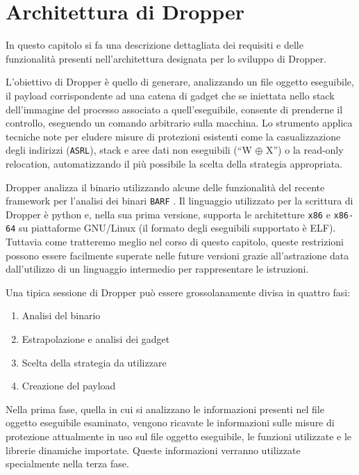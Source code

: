 \chapter{Architettura di Dropper}
\label{cap:architettura}

In questo capitolo si fa una descrizione dettagliata dei requisiti e
delle funzionalità presenti nell'architettura designata per lo
sviluppo di Dropper.

L'obiettivo di Dropper è quello di generare, analizzando un file
oggetto eseguibile, il payload corrispondente ad una catena di gadget
che se iniettata nello stack dell'immagine del processo associato a
quell'eseguibile, consente di prenderne il controllo, eseguendo un
comando arbitrario sulla macchina. Lo strumento applica tecniche note
per eludere misure di protezioni esistenti come la casualizzazione
degli indirizzi (\lstinline{ASRL}), stack e aree dati non eseguibili
(``W $\oplus$ X'') o la read-only relocation, automatizzando il più
possibile la scelta della strategia appropriata. 

Dropper analizza il binario utilizzando alcune delle funzionalità del
recente framework per l'analisi dei binari \lstinline{BARF}
\cite{Heitman-14}. Il linguaggio utilizzato per la scrittura di
Dropper è python e, nella sua prima versione, supporta le architetture
\lstinline{x86} e \lstinline{x86-64} su piattaforme GNU/Linux (il
formato degli eseguibili supportato è ELF). Tuttavia come tratteremo
meglio nel corso di questo capitolo, queste restrizioni possono essere
facilmente superate nelle future versioni grazie all'astrazione data
dall'utilizzo di un linguaggio intermedio per rappresentare le
istruzioni.

Una tipica sessione di Dropper può essere grossolanamente divisa in
quattro fasi:

\begin{enumerate}
\item Analisi del binario 
\item Estrapolazione e analisi dei gadget
\item Scelta della strategia da utilizzare
\item Creazione del payload
\end{enumerate}

Nella prima fase, quella in cui si analizzano le informazioni presenti
nel file oggetto eseguibile esaminato, vengono ricavate le
informazioni sulle misure di protezione attualmente in uso sul file
oggetto eseguibile, le funzioni utilizzate e le librerie dinamiche
importate. Queste informazioni verranno utilizzate specialmente nella
terza fase.

